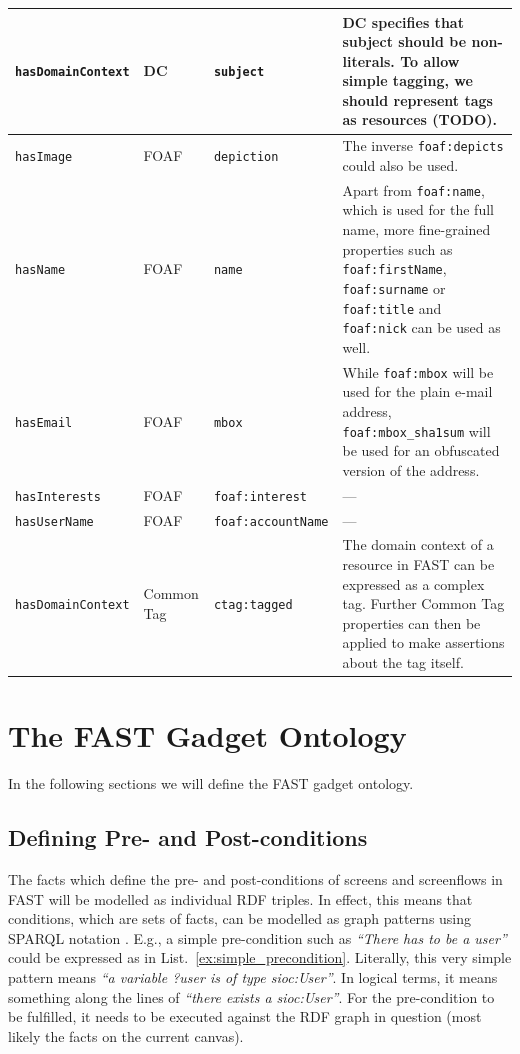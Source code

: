 \documentclass{fast_latex}
\begin{document}
\begin{small}
\begin{longtable}{|p{2.6cm}|p{1.5cm}|p{3cm}|p{7cm}|}
\texttt{hasDomainContext} & DC & \texttt{subject} & DC specifies that subject should be non-literals. To allow simple tagging, we should represent tags as resources (TODO). \\ \hline
\texttt{hasImage} & FOAF & \texttt{depiction} & The inverse \texttt{foaf:depicts} could also be used. \\ \hline
\texttt{hasName} & FOAF & \texttt{name} & Apart from \texttt{foaf:name}, which is used for the full name, more fine-grained properties such as \texttt{foaf:firstName}, \texttt{foaf:surname} or \texttt{foaf:title} and \texttt{foaf:nick} can be used as well. \\ \hline
\texttt{hasEmail} & FOAF & \texttt{mbox} & While \texttt{foaf:mbox} will be used for the plain e-mail address, \texttt{foaf:mbox\_sha1sum} will be used for an obfuscated version of the address. \\ \hline
\texttt{hasInterests} & FOAF & \texttt{foaf:interest} & --- \\ \hline
\texttt{hasUserName} & FOAF & \texttt{foaf:accountName} & --- \\ \hline
\texttt{hasDomainContext} & Common Tag & \texttt{ctag:tagged} & The domain context of a resource in FAST can be expressed as a complex tag. Further Common Tag properties can then be applied to make assertions about the tag itself. \\ \hline
\end{longtable}
\end{small}
\doublespacing

%
%
%
\section{The FAST Gadget Ontology} %
\label{sec:ontology}

In the following sections we will define the FAST gadget ontology.

\subsection{Defining Pre- and Post-conditions} %
\label{sub:defining_pre_and_post_conditions}

The facts which define the pre- and post-conditions of screens and screenflows in FAST will be modelled as individual RDF triples. In effect, this means that conditions, which are sets of facts, can be modelled as graph patterns using SPARQL notation \cite{sparql2008spec}. E.g., a simple pre-condition such as \emph{``There has to be a user''} could be expressed as in List.~\ref{ex:simple_precondition}. Literally, this very simple pattern means \emph{``a variable ?user is of type sioc:User''}. In logical terms, it means something along the lines of \emph{``there exists a sioc:User''}. For the pre-condition to be fulfilled, it needs to be executed against the RDF graph in question (most likely the facts on the current canvas).
\end{document}
